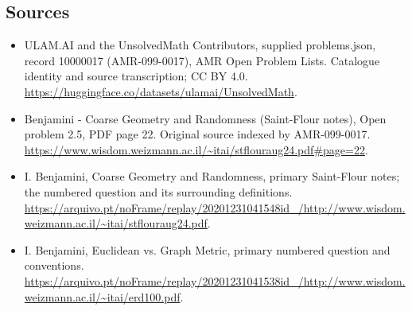 \documentclass[11pt,a4paper]{article}
\begin{document}
\subsection{Sources}
\begin{itemize}
\item[S1] ULAM.AI and the UnsolvedMath Contributors, supplied problems.json, record 10000017 (AMR-099-0017), AMR Open Problem Lists. Catalogue identity and source transcription; CC BY 4.0.
\url{https://huggingface.co/datasets/ulamai/UnsolvedMath}.
\item[S2] Benjamini - Coarse Geometry and Randomness (Saint-Flour notes), Open problem 2.5, PDF page 22. Original source indexed by AMR-099-0017.
\url{https://www.wisdom.weizmann.ac.il/~itai/stflouraug24.pdf#page=22}.
\item[S3] I. Benjamini, Coarse Geometry and Randomness, primary Saint-Flour notes; the numbered question and its surrounding definitions.
\url{https://arquivo.pt/noFrame/replay/20201231041548id_/http://www.wisdom.weizmann.ac.il/~itai/stflouraug24.pdf}.
\item[S4] I. Benjamini, Euclidean vs. Graph Metric, primary numbered question and conventions.
\url{https://arquivo.pt/noFrame/replay/20201231041538id_/http://www.wisdom.weizmann.ac.il/~itai/erd100.pdf}.
\end{itemize}
\end{document}
